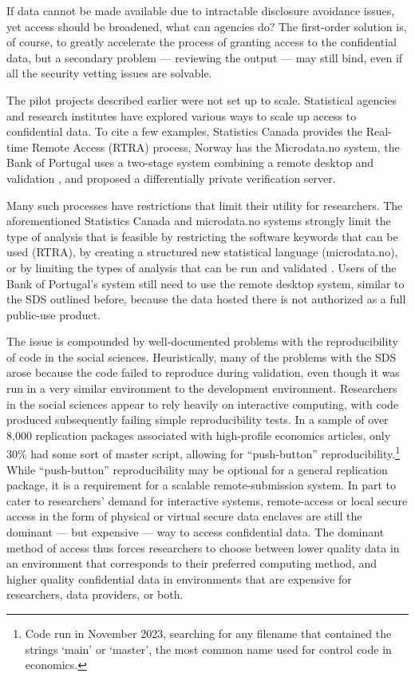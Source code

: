 \documentclass[12pt]{article}
\begin{document}
If data cannot be made available due to intractable disclosure avoidance issues, yet access should be broadened, what can agencies do?  The first-order solution is, of course, to greatly accelerate the process of granting access to the confidential data, but a secondary problem --- reviewing the output  --- may still bind, even if all the security vetting issues are solvable.

The pilot projects described earlier were not set up to scale. Statistical agencies and research institutes have explored various ways to scale up access to confidential data. To cite a few examples, Statistics Canada provides the Real-time Remote Access (RTRA) process, Norway has the Microdata.no system, the Bank of Portugal uses a two-stage system combining a remote desktop and validation \citep{guimaraes_reproducibility_2023}, and \citet{barrientos_providing_2018} proposed a differentially private verification server. 

Many such processes have restrictions that limit their utility for researchers. The aforementioned Statistics Canada and microdata.no systems strongly limit the type of analysis that is feasible by restricting the software keywords that can be used (RTRA), by creating a structured new statistical language (microdata.no), or by limiting the types of analysis that can be run and validated \citep{barrientos_providing_2018}. Users of the Bank of Portugal's system still need to use the remote desktop system, similar to the SDS outlined before, because the data hosted there is not authorized as a full public-use product.

The issue is compounded by well-documented problems with the reproducibility of code in the social sciences. Heuristically, many of the problems with the SDS arose because the code failed to reproduce during validation, even though it was  run in a very similar environment to the development environment. Researchers in the social sciences appear to rely heavily on interactive computing, with code produced subsequently failing simple reproducibility tests. In a sample of over 8,000 replication packages associated with high-profile economics articles, only 30\% had some sort of master script, allowing for ``push-button'' reproducibility.\footnote{Code run in November 2023, searching for any filename that contained the strings `main' or `master', the most common name used for control code in economics.} While ``push-button'' reproducibility may be optional for a general replication package, it is a requirement for a scalable remote-submission system. In part to cater to researchers' demand for interactive systems, remote-access or local secure access in the form of physical or virtual secure data enclaves are still the dominant --- but expensive --- way to access confidential data. The dominant method of access thus forces researchers to choose between lower quality data in an environment that corresponds to their preferred computing method, and higher quality confidential data in environments that are expensive for researchers, data providers, or both.
\end{document}
